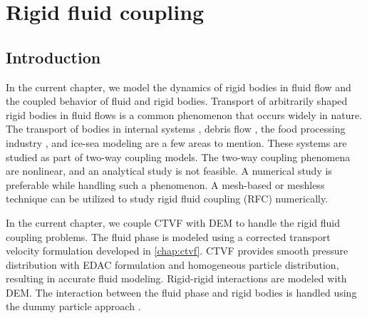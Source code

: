 \chapter{Rigid fluid coupling}
\label{chap:rfc}

\section{Introduction}
\label{sec:rfc:intro}
In the current chapter, we model the dynamics of rigid bodies in fluid flow and
the coupled behavior of fluid and rigid bodies. Transport of arbitrarily shaped
rigid bodies in fluid flows is a common phenomenon that occurs widely in nature.
The transport of bodies in internal systems \citep{Dai2021}, debris flow
\citep{Qingyun2022}, the food processing industry \citep{Karunasena2014}, and
ice-sea modeling \citep{Mintu2018} are a few areas to mention. These systems are
studied as part of two-way coupling models. The two-way coupling phenomena are
nonlinear, and an analytical study is not feasible. A numerical study is
preferable while handling such a phenomenon. A mesh-based or meshless technique
can be utilized to study rigid fluid coupling (RFC) numerically.


In the current chapter, we couple CTVF with DEM to handle the rigid fluid
coupling problems. The fluid phase is modeled using a corrected transport
velocity formulation developed in \cref{chap:ctvf}. CTVF provides smooth
pressure distribution with EDAC formulation and homogeneous particle
distribution, resulting in accurate fluid modeling. Rigid-rigid interactions are
modeled with DEM. The interaction between the fluid phase and rigid bodies is
handled using the dummy particle approach \citep{Adami2012}.


\FloatBarrier%
